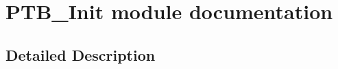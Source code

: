 \hypertarget{group___p_t_b___init__module}{}\section{P\+T\+B\+\_\+\+Init module documentation}
\label{group___p_t_b___init__module}


\subsection{Detailed Description}
